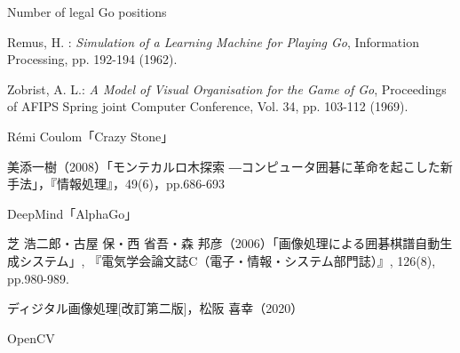 \documentclass[openright]{nitocs}
\numberwithin{equation}{section}
\begin{document}
    \begin{thebibliography}{10} %

        Number of legal Go positions

        Remus, H. : 
        {\it Simulation of a Learning Machine for Playing Go}, 
        Information Processing, 
        pp. 192-194 (1962). 

        Zobrist, A. L.: 
        {\it A Model of Visual Organisation for the Game of Go}, 
        Proceedings of AFIPS Spring joint Computer Conference, 
        Vol. 34, pp. 103-112 (1969). 

        Rémi Coulom「Crazy Stone」

        美添一樹（2008）「モンテカルロ木探索 ―コンピュータ囲碁に革命を起こした新手法」，『情報処理』，49(6)，pp.686-693

        DeepMind「AlphaGo」

        芝 浩二郎・古屋 保・西 省吾・森 邦彦（2006）「画像処理による囲碁棋譜自動生成システム」,  『電気学会論文誌C（電子・情報・システム部門誌）』, 126(8), pp.980-989.

        ディジタル画像処理[改訂第二版]，松阪 喜幸（2020）

        OpenCV





\end{thebibliography}
\end{document}
